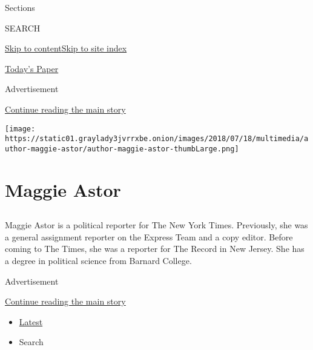 Sections

SEARCH

\protect\hyperlink{site-content}{Skip to
content}\protect\hyperlink{site-index}{Skip to site index}

\href{https://myaccount.nytimes3xbfgragh.onion/auth/login?response_type=cookie\&client_id=vi}{}

\href{https://www.nytimes3xbfgragh.onion/section/todayspaper}{Today's
Paper}

Advertisement

\protect\hyperlink{after-top}{Continue reading the main story}

\texttt{[image: https://static01.graylady3jvrrxbe.onion/images/2018/07/18/multimedia/author-maggie-astor/author-maggie-astor-thumbLarge.png]}

\hypertarget{maggie-astor}{%
\section{Maggie Astor}\label{maggie-astor}}

\subsection{}

Maggie Astor is a political reporter for The New York Times. Previously,
she was a general assignment reporter on the Express Team and a copy
editor. Before coming to The Times, she was a reporter for The Record in
New Jersey. She has a degree in political science from Barnard College.

Advertisement

\protect\hyperlink{after-mid1}{Continue reading the main story}

\begin{itemize}
\tightlist
\item
  \protect\hyperlink{stream-panel}{Latest}
\item
  Search
\end{itemize}

